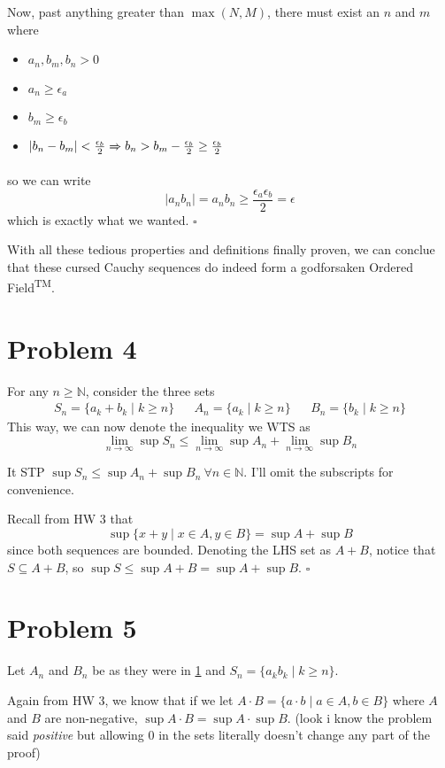 \documentclass[12pt]{article}
\newcommand{\ra}{\xRightarrow}
\newcommand{\N}{\mathbb{N}}
\begin{document}
Now, past anything greater than $\max(N, M)$, there must exist an $n$ and $m$ where
\begin{itemize}[nolistsep]
  \item $a_n, b_m, b_n > 0$
  \item $a_n \ge \epsilon_a$
  \item $b_m \ge \epsilon_b$
  \item $|b_n-b_m| < \frac{\epsilon_b}{2} \ra{} b_n > b_m - \frac{\epsilon_b}{2} \ge \frac{\epsilon_b}{2}$
\end{itemize}
so we can write
\[|a_nb_n|=a_nb_n \ge \frac{\epsilon_a\epsilon_b}{2}=\epsilon\]
which is exactly what we wanted. $\square$

With all these tedious properties and definitions finally proven,
we can conclue that these cursed Cauchy sequences do indeed form a godforsaken Ordered Field\textsuperscript{TM}.

\pagebreak

\section{Problem 4}\label{sec:p4}

For any $n \ge \N$, consider the three sets
\begin{align*}
  S_n=\{a_k+b_k \mid k \ge n\}
   &  & A_n=\{a_k \mid k \ge n\}
   &  & B_n=\{b_k \mid k \ge n\}
\end{align*}
This way, we can now denote the inequality we WTS as
\[\lim_{n \to \infty} \sup S_n \le \lim_{n \to \infty} \sup A_n + \lim_{n \to \infty} \sup B_n\]

It STP $\sup S_n \le \sup A_n + \sup B_n\ \forall n \in \N$.
I'll omit the subscripts for convenience.

Recall from HW 3 that
\[\sup \{x+y \mid x \in A, y \in B\} = \sup A + \sup B\]
since both sequences are bounded.
Denoting the LHS set as $A+B$, notice that $S \subseteq A+B$,
so $\sup S \le \sup A+B = \sup A + \sup B$. $\square$

\section{Problem 5}

Let $A_n$ and $B_n$ be as they were in \ref{sec:p4} and $S_n=\{a_kb_k \mid k \ge n\}$.

Again from HW 3, we know that if we let $A \cdot B = \{a \cdot b \mid a \in A, b \in B\}$
where $A$ and $B$ are non-negative, $\sup A \cdot B = \sup A \cdot \sup B$.
(look i know the problem said \textit{positive} but allowing $0$ in the sets literally doesn't change any part of the proof)
\end{document}
